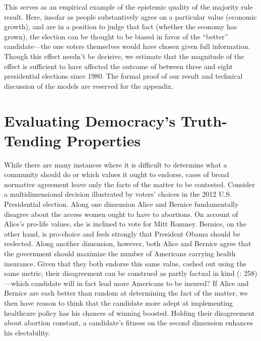 \documentclass[11pt]{article}
\begin{document}
This serves as an empirical example of the epistemic quality of the majority rule result. Here, insofar as people substantively agree on a particular value (economic growth), and are in a position to judge that fact (whether the economy has grown), the election can be thought to be biased in favor of the ``better'' candidate---the one voters themselves would have chosen given full information. %
Though this effect needn't be decisive, we estimate that the magnitude of the effect is sufficient to have affected the outcome of between three and eight presidential elections since 1980. The formal proof of our result and technical discussion of the models are reserved for the appendix.


\section{Evaluating Democracy's Truth-Tending Properties}\label{sec:theory}


While there are many instances where it is difficult to determine what a community should do or which values it ought to endorse, cases of broad normative agreement leave only the facts of the matter to be contested.
 Consider a multidimensional decision illustrated by voters' choices in the 2012 U.S. Presidential election. Along one dimension Alice and Bernice fundamentally disagree about the access women ought to have to abortions. On account of Alice's pro-life values, she is inclined to vote for Mitt Romney. Bernice, on the other hand, is pro-choice and feels strongly that President Obama should be reelected. Along another dimension, however, both Alice and Bernice agree that the government should maximize the number of Americans carrying health insurance. Given that they both endorse this same value, cashed out using the same metric, their disagreement can be construed as partly factual in kind (\citet{Page2007}: 258)---which candidate will in fact lead more Americans to be insured? If Alice and Bernice are each better than random at determining the fact of the matter, we then have reason to think that the candidate more adept at implementing healthcare policy has his chances of winning boosted. Holding their disagreement about abortion constant, a candidate's fitness on the second dimension enhances his electability.
\end{document}
